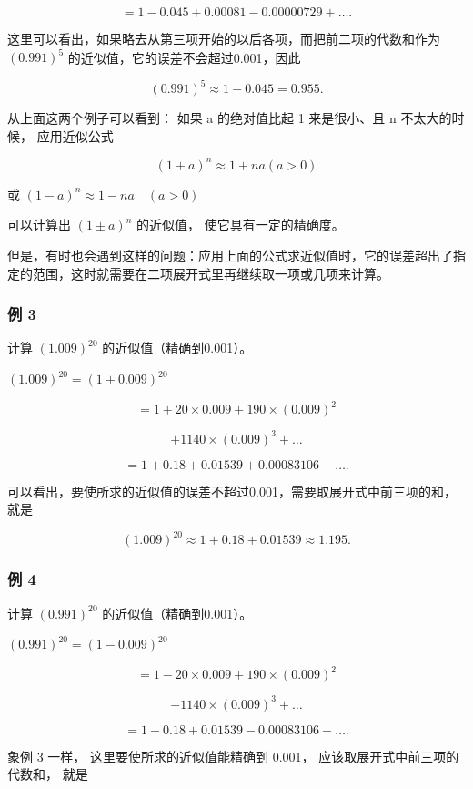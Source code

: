 \[
= 1 - 0.045 + 0.00081 - 0.00000729 + \dots .
\]

这里可以看出，如果略去从第三项开始的以后各项，而把前二项的代数和作为
\((0.991)^{5}\) 的近似值，它的误差不会超过0.001，因此

\[
(0.991) ^ {5} \approx 1 - 0.045 = 0.955.
\]

从上面这两个例子可以看到： 如果 a 的绝对值比起 1 来是很小、且 n
不太大的时候， 应用近似公式

\[
\boxed {(1 + a) ^ {n} \approx 1 + n a (a > 0)}
\]

或 \(\boxed{(1-a)^{n}\approx1-na\quad(a>0)}\)

可以计算出 \((1 \pm a)^n\) 的近似值， 使它具有一定的精确度。

但是，有时也会遇到这样的问题：应用上面的公式求近似值时，它的误差超出了指定的范围，这时就需要在二项展开式里再继续取一项或几项来计算。

\subsubsection{例 3}

计算 \((1.009)^{20}\) 的近似值（精确到0.001）。

 \((1.009)^{20} = (1 + 0.009)^{20}\)

\[
= 1 + 20 \times 0.009 + 190 \times (0.009) ^ {2}
\]

\[
+ 1140 \times (0.009) ^ {3} + \dots
\]

\[
= 1 + 0.18 + 0.01539 + 0.00083106 + \dots .
\]

可以看出，要使所求的近似值的误差不超过0.001，需要取展开式中前三项的和，就是

\[
(1.009) ^ {20} \approx 1 + 0.18 + 0.01539 \approx 1.195.
\]

\subsubsection{例 4}

计算 \((0.991)^{20}\) 的近似值（精确到0.001）。

 \((0.991)^{20} = (1 - 0.009)^{20}\)

\[
= 1 - 20 \times 0.009 + 190 \times (0.009) ^ {2}
\]

\[
- 1140 \times (0.009) ^ {3} + \dots
\]

\[
= 1 - 0.18 + 0.01539 - 0.00083106 + \dots .
\]

象例 3 一样， 这里要使所求的近似值能精确到 0.001，
应该取展开式中前三项的代数和， 就是

